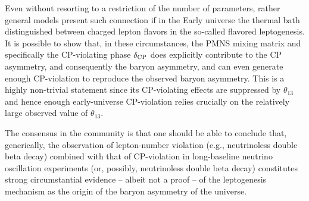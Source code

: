  Even without resorting to a restriction of the number of parameters, rather general models present such connection
if in the Early universe the thermal bath distinguished between charged lepton flavors in the so-called flavored leptogenesis.
 It is possible to show that, in these circumstances, the PMNS mixing matrix and specifically the CP-violating phase $\delta_{\rm CP}$ does explicitly contribute to the CP asymmetry, and consequently the baryon asymmetry, and can even generate enough CP-violation to reproduce the observed baryon
 asymmetry. This is a highly non-trivial statement since its CP-violating effects are suppressed by $\theta_{13}$ and hence enough early-universe CP-violation relies crucially on the relatively large observed value of $\theta_{13}$. 


The consensus in the community is that one should be able to conclude that, generically, the observation of lepton-number violation (e.g., neutrinoless double beta decay) combined with that of  CP-violation in long-baseline neutrino oscillation experiments (or, possibly, neutrinoless double beta decay) constitutes strong circumstantial evidence -- albeit not a proof -- of the leptogenesis mechanism as the origin of the baryon asymmetry of the universe.

